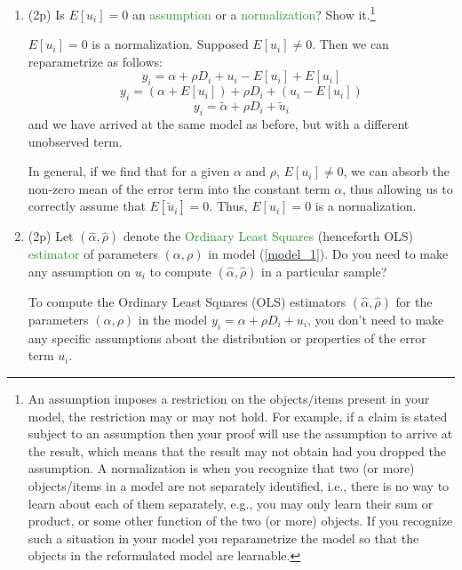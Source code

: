 \documentclass{article}
\newcommand{\gap}{\vspace{1 em}}
\begin{document}
\begin{enumerate}[label=\textbf{Q\arabic{enumi}}.,ref=Q\arabic{enumi}, wide=0pt, itemsep=1em, topsep=5pt]
\begin{enumerate}
        \newpage
        \item (2p) Is $E\left[ u _{i}\right] =0$ an \textcolor{ForestGreen}{assumption} or a \textcolor{ForestGreen}{normalization}? Show it.\footnote{An assumption imposes a restriction on the objects/items present in your model, the restriction may or may not hold. For example, if a claim is stated subject to an assumption then your proof will use the assumption to arrive at the result, which means that the result may not obtain had you dropped the assumption. A normalization is when you recognize that two (or more) objects/items in a model are not separately identified, i.e., there is no way to learn about each of them separately, e.g., you may only learn their sum or product, or some other function of the two (or more) objects. If you recognize such a situation in your model you reparametrize the model so that the objects in the reformulated model are learnable.}
        \begin{solution}
            {
                $E[u_i] = 0$ is a normalization. Supposed $E[u_i] \neq 0$. Then we can reparametrize as follows:
                \[ y_i = \alpha + \rho D_i + u_i - E[u_i]  + E[u_i]\]
                \[ y_i = (\alpha + E[u_i]) + \rho D_i + \left( u_i - E[u_i] \right) \]
                \[ y_i = \tilde{\alpha} + \rho D_i + \tilde{u}_i \]
                and we have arrived at the same model as before, but with a different unobserved term. 

                \gap
                In general, if we find that for a given $\alpha$ and $\rho$, $E[u_i] \neq 0$, we can absorb the non-zero mean of the error term into the constant term $\alpha$, thus allowing us to correctly assume that $E[\tilde{u}_i] = 0$. Thus, $E[u_i] = 0$ is a normalization.
            }
        \end{solution}
        \gap
        \item (2p) Let $\left( \widehat{\alpha },\widehat{\rho }\right) $ denote the \textcolor{ForestGreen}{Ordinary Least Squares} (henceforth OLS) \textcolor{ForestGreen}{estimator} of parameters $\left(\alpha ,\rho \right)$ in model (\ref{model_1}). Do you need to make any assumption on $u _{i}$ to compute $\left( \widehat{\alpha },\widehat{\rho }\right) $ in a particular sample?
        \begin{solution}
            {
                To compute the Ordinary Least Squares (OLS) estimators $\left(\widehat{\alpha}, \widehat{\rho}\right)$ for the parameters $\left(\alpha, \rho\right)$ in the model \(y_{i} = \alpha + \rho D_{i} + u_{i}\), you don't need to make any specific assumptions about the distribution or properties of the error term \(u_{i}\). 

}
\end{solution}
\end{enumerate}
\end{enumerate}
\end{document}

